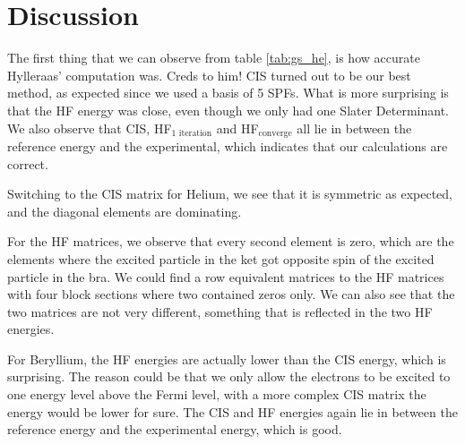 \section{Discussion} \label{sec:discussion}
The first thing that we can observe from table \eqref{tab:gs_he}, is how accurate Hylleraas' computation was. Creds to him! CIS turned out to be our best method, as expected since we used a basis of 5 SPFs. What is more surprising is that the HF energy was close, even though we only had one Slater Determinant. We also observe that CIS, HF$_{\text{1 iteration}}$ and HF$_{\text{converge}}$ all lie in between the reference energy and the experimental, which indicates that our calculations are correct. 

Switching to the CIS matrix for Helium, we see that it is symmetric as expected, and the diagonal elements are dominating. 

For the HF matrices, we observe that every second element is zero, which are the elements where the excited particle in the ket got opposite spin of the excited particle in the bra. We could find a row equivalent matrices to the HF matrices with four block sections where two contained zeros only. We can also see that the two matrices are not very different, something that is reflected in the two HF energies.

For Beryllium, the HF energies are actually lower than the CIS energy, which is surprising. The reason could be that we only allow the electrons to be excited to one energy level above the Fermi level, with a more complex CIS matrix the energy would be lower for sure. The CIS and HF energies again lie in between the reference energy and the experimental energy, which is good. 